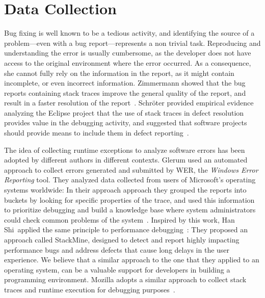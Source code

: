 



\section{Data Collection}\label{sec:related-stacktraces}

Bug fixing is well known to be a tedious activity, and identifying the source of a problem---even with a bug report---represents a non trivial task.
Reproducing and understanding the error is usually cumbersome, as the developer does not have access to the original environment where the error occurred.
As a consequence, she cannot fully rely on the information in the report, as it might contain incomplete, or even incorrect information.
Zimmermann \etal showed that the bug reports containing stack traces improve the general quality of the report, and result in a faster resolution of the report~\cite{Zimm2010a}.
Schr\"oter \etal provided empirical evidence analyzing the Eclipse project that the use of stack traces in defect resolution provides value in the debugging activity, and suggested that software projects should provide means to include them in defect reporting~\cite{Schr2010a}.

The idea of collecting runtime exceptions to analyze software errors has been adopted by different authors in different contexts.
Glerum \etal used an automated approach to collect errors generated and submitted by WER, the \emph{Windows Error Reporting} tool.
They analyzed data collected from users of Microsoft's operating systems worldwide: In their approach approach they grouped the reports into buckets by looking for specific properties of the trace, and used this information to prioritize debugging and build a knowledge base where system administrators could check common problems of the system~\cite{Glerum2009}.
Inspired by this work, Han Shi~\etal applied the same principle to performance debugging~\cite{Han2012}: They proposed an approach called StackMine, designed to detect and report highly impacting performance bugs and address defects that cause long delays in the user experience.
We believe that a similar approach to the one that they applied to an operating system, can be a valuable support for developers in building a programming environment.
Mozilla adopts a similar approach to collect stack traces and runtime execution for debugging purposes~\cite{McLa2004}.

